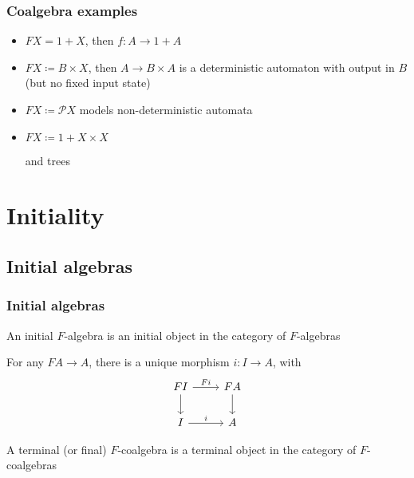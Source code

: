 \documentclass{beamer}
\begin{document}
\begin{frame}
  \frametitle{Coalgebra examples}
  \begin{itemize}
    \item<1-> $FX = 1 + X$, then $f: A \to 1 + A$
      \begin{center}
      \end{center}
    \item<3-> $FX \coloneqq B \times X$, then $A \to B \times A$ is a deterministic automaton with output in $B$ (but no fixed input state)
    \item<4-> $FX \coloneqq \mathcal{P}X$ models non-deterministic automata
    \item <5-> $FX \coloneqq 1 + X \times X$
      \begin{center}
      \end{center}
      and trees
  \end{itemize}
\end{frame}

\section{Initiality}
\subsection{Initial algebras}
\begin{frame}[fragile]
  \frametitle{Initial algebras}
  \begin{definition}
    An initial $F$-algebra is an initial object in the category of $F$-algebras
  \end{definition}
  For any $FA \to A$, there is a unique morphism $i: I \to A$, with
  \begin{equation*}
  \begin{tikzcd}
    FI \rar{Fi} \dar & FA \dar \\
    I \rar{i} & A
  \end{tikzcd}
  \end{equation*}
  \pause
  \begin{definition}
    A terminal (or final) $F$-coalgebra is a terminal object in the category of $F$-coalgebras
  \end{definition}
\end{frame}
\end{document}
